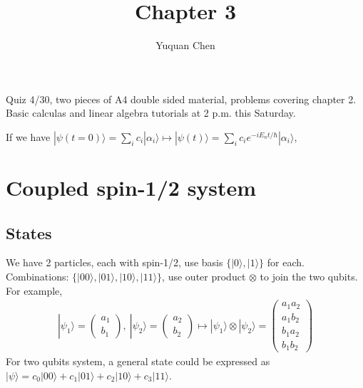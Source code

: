 \documentclass[UTF8,12pt]{article} %
\begin{document}
\title{Chapter 3}
\author{Yuquan Chen}
\date{} %
\maketitle

Quiz 4/30, two pieces of A4 double sided material, problems covering chapter 2. Basic calculas and linear algebra tutorials at 2 p.m. this Saturday.

If we have $|\psi(t=0)\rangle = \sum_i c_i|\alpha_i\rangle \mapsto |\psi(t)\rangle = \sum_i c_i e^{-iE_n t/\hbar}|\alpha_i\rangle$, 

\section{Coupled spin-1/2 system}

\subsection{States}
We have 2 particles, each with spin-1/2, use basis $\{|0\rangle,|1\rangle\}$ for each. Combinations: $\{|00\rangle,|01\rangle,|10\rangle,|11\rangle\}$, use outer product $\otimes$ to join the two qubits. For example,
\begin{align}
|\psi_1\rangle = \begin{pmatrix}a_1\\b_1\end{pmatrix},~|\psi_2\rangle = \begin{pmatrix}a_2\\b_2\end{pmatrix}\longmapsto |\psi_1\rangle\otimes|\psi_2\rangle = \begin{pmatrix}a_1a_2\\a_1b_2\\b_1a_2\\b_1b_2\end{pmatrix}
\end{align}
For two qubits system, a general state could be expressed as $|\psi\rangle = c_0|00\rangle + c_1|01\rangle + c_2|10\rangle + c_3|11\rangle$.
\end{document}
